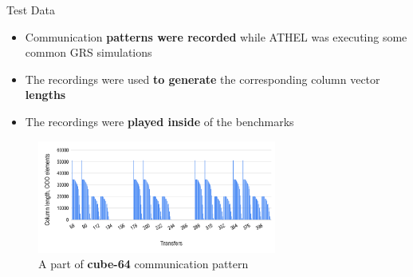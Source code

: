 \ifSpeech
\begin{frame}[t]{Test Data}
    \justifying
    \begin{itemize}
        \item Communication \textbf{patterns were recorded} while ATHEL was executing some common GRS simulations
        
        \item The recordings were used \textbf{to generate} the corresponding column vector \textbf{lengths}
        
        \item The recordings were \textbf{played inside} of the benchmarks
    \end{itemize}
    
    \begin{figure}[htpb]
        \centering
        \includegraphics[width=0.7\textwidth]{figures/chapter-3/communication-pattern.png}
        \caption{A part of \textbf{cube-64} communication pattern} \label{fig:communication-pattern}
    \end{figure}

\end{frame}



